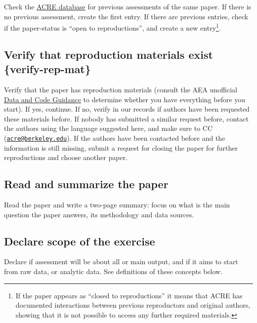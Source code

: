\documentclass[]{book}
\begin{document}
Check the \href{ADD\%20LINK}{ACRE database} for previous assessments of the same paper. If there is no previous assessment, create the first entry. If there are previous entries, check if the paper-status is ``open to reproductions'', and create a new entry\footnote{If the paper appears as ``closed to reproductions'' it means that ACRE has documented interactions between previous reproductors and original authors, showing that it is not possible to access any further required materials. }.

\hypertarget{verify-that-reproduction-materials-exist-verify-rep-mat}{%
\subsection{Verify that reproduction materials exist \{verify-rep-mat\}}\label{verify-that-reproduction-materials-exist-verify-rep-mat}}

Verify that the paper has reproduction materials (consult the AEA unofficial \href{https://social-science-data-editors.github.io/guidance/Verification_guidance.html}{Data and Code Guidance} to determine whether you have everything before you start). If yes, continue. If no, verify in our records if authors have been requested these materials before. If nobody has submitted a similar request before, contact the authors using the language suggested here, and make sure to CC (\href{mailto:acre@berkeley.edu}{\nolinkurl{acre@berkeley.edu}}). If the authors have been contacted before and the information is still missing, submit a request for closing the paper for further reproductions and choose another paper.

\hypertarget{read-sum}{%
\subsection{Read and summarize the paper}\label{read-sum}}

Read the paper and write a two-page summary: focus on what is the main question the paper answers, its methodology and data sources.

\hypertarget{declare-scope-of-the-exercise}{%
\subsection{Declare scope of the exercise}\label{declare-scope-of-the-exercise}}

Declare if assessment will be about all or main output, and if it aims to start from raw data, or analytic data. See definitions of these concepts below.
\end{document}
